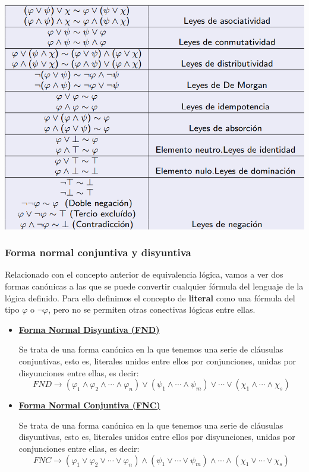 \documentclass[10pt,a4paper,openright]{book}
\begin{document}
\begin{center}
\includegraphics[scale=0.5]{Leyes Algebraicas de Boole}
\end{center}

\subsubsection{Forma normal conjuntiva y disyuntiva}
Relacionado con el concepto anterior de equivalencia lógica, vamos a ver dos formas canónicas a las que se puede convertir cualquier fórmula del lenguaje de la lógica definido. Para ello definimos el concepto de \textbf{literal} como una fórmula del tipo $\varphi$ o $\neg \varphi$, pero no se permiten otras conectivas lógicas entre ellas.
\begin{itemize}
\item \underline{\textbf{Forma Normal Disyuntiva (FND)}}

Se trata de una forma canónica en la que tenemos una serie de cláusulas conjuntivas, esto es, literales unidos entre ellos por conjunciones, unidas por disyunciones entre ellas, es decir:
$$FND\rightarrow (\varphi_1 \wedge \varphi_2 \wedge \cdots \wedge \varphi_n) \vee (\psi_1 \wedge \cdots \wedge \psi_m) \vee \cdots \vee (\chi_1 \wedge \cdots \wedge \chi_s)$$

\item \underline{\textbf{Forma Normal Conjuntiva (FNC)}}

Se trata de una forma canónica en la que tenemos una serie de cláusulas disyuntivas, esto es, literales unidos entre ellos por disyunciones, unidas por conjunciones entre ellas, es decir:
$$FNC\rightarrow (\varphi_1 \vee \varphi_2 \vee \cdots \vee \varphi_n) \wedge (\psi_1 \vee \cdots \vee \psi_m) \wedge \cdots \wedge (\chi_1 \vee \cdots \vee \chi_s)$$
\end{itemize}
\end{document}
